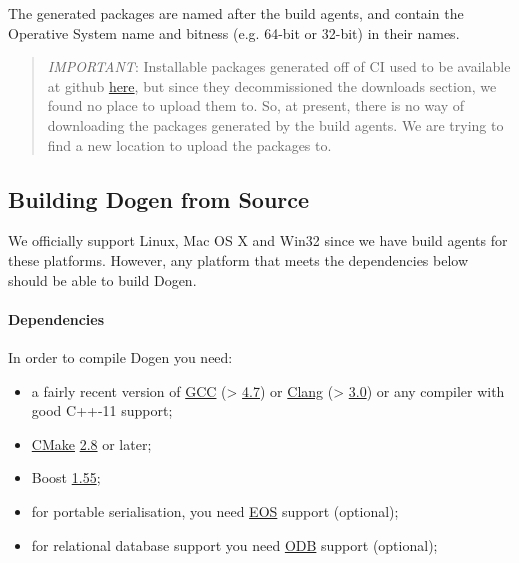 \documentclass{book}
\begin{document}
The generated packages are named after the build agents, and contain
the Operative System name and bitness (e.g. 64-bit or 32-bit) in their
names.

\begin{quote}
\emph{IMPORTANT}: Installable packages generated off of CI used to be
available at github
\href{https://github.com/DomainDrivenConsulting/dogen/downloads}{here},
but since they decommissioned the downloads section, we found no place
to upload them to. So, at present, there is no way of downloading the
packages generated by the build agents. We are trying to find a new
location to upload the packages to.
\end{quote}

\subsection{Building Dogen from Source}

We officially support Linux, Mac OS X and Win32 since we have build
agents for these platforms. However, any platform that meets the
dependencies below should be able to build Dogen.

\paragraph{Dependencies}

In order to compile Dogen you need:

\begin{itemize}
\item a fairly recent version of \href{http://gcc.gnu.org/}{GCC} (>
  \href{http://gcc.gnu.org/gcc-4.7/}{4.7}) or
  \href{http://clang.llvm.org/index.html}{Clang} (>
  \href{http://llvm.org/releases/3.0/docs/ClangReleaseNotes.html}{3.0})
  or any compiler with good C++-11 support;
\item \href{http://www.cmake.org/}{CMake}
  \href{http://www.kitware.com/news/home/browse/CMake?2013_05_22&CMake\%2B2.8.11\%2BNow\%2BAvailable}{2.8}
  or later;
\item Boost
  \href{http://www.boost.org/users/history/version_1_55_0.html}{1.55};
\item for portable serialisation, you need
  \href{http://epa.codeplex.com/}{EOS} support (optional);
\item for relational database support you need
  \href{http://www.codesynthesis.com/products/odb/}{ODB} support
  (optional);
\end{itemize}
\end{document}
